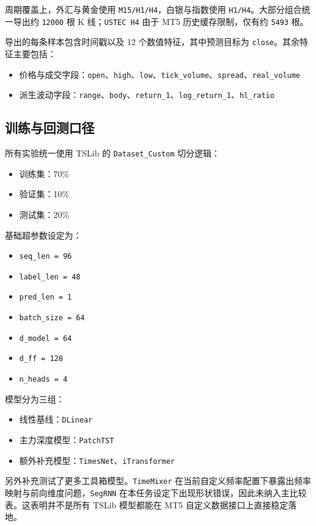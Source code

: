 \documentclass[11pt,a4paper]{ctexart}
\begin{document}
周期覆盖上，外汇与黄金使用 \texttt{M15/H1/H4}，白银与指数使用 \texttt{H1/H4}。大部分组合统一导出约 \texttt{12000} 根 K 线；\texttt{USTEC H4} 由于 MT5 历史缓存限制，仅有约 \texttt{5493} 根。

导出的每条样本包含时间戳以及 12 个数值特征，其中预测目标为 \texttt{close}。其余特征主要包括：
\begin{itemize}
  \item 价格与成交字段：\texttt{open}、\texttt{high}、\texttt{low}、\texttt{tick\_volume}、\texttt{spread}、\texttt{real\_volume}
  \item 派生波动字段：\texttt{range}、\texttt{body}、\texttt{return\_1}、\texttt{log\_return\_1}、\texttt{hl\_ratio}
\end{itemize}

\subsection{训练与回测口径}

所有实验统一使用 TSLib 的 \texttt{Dataset\_Custom} 切分逻辑：
\begin{itemize}
  \item 训练集：70\%
  \item 验证集：10\%
  \item 测试集：20\%
\end{itemize}

基础超参数设定为：
\begin{itemize}
  \item \texttt{seq\_len = 96}
  \item \texttt{label\_len = 48}
  \item \texttt{pred\_len = 1}
  \item \texttt{batch\_size = 64}
  \item \texttt{d\_model = 64}
  \item \texttt{d\_ff = 128}
  \item \texttt{n\_heads = 4}
\end{itemize}

模型分为三组：
\begin{itemize}
  \item 线性基线：\texttt{DLinear}
  \item 主力深度模型：\texttt{PatchTST}
  \item 额外补充模型：\texttt{TimesNet}、\texttt{iTransformer}
\end{itemize}

另外补充测试了更多工具箱模型。\texttt{TimeMixer} 在当前自定义频率配置下暴露出频率映射与前向维度问题，\texttt{SegRNN} 在本任务设定下出现形状错误，因此未纳入主比较表。这表明并不是所有 TSLib 模型都能在 MT5 自定义数据接口上直接稳定落地。
\end{document}
